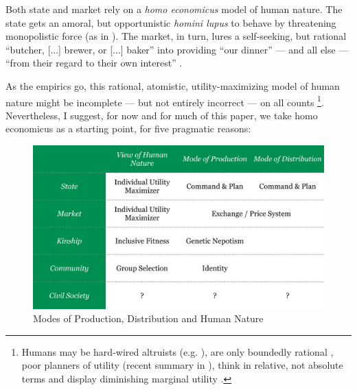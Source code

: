 \documentclass[11pt,a4paper,oneside,openright]{article}
\begin{document}
\begin{enumerate}
	Both state and market rely on a \emph{homo economicus} model of human nature. 
	The state gets an amoral, but opportunistic \emph{homini lupus} to behave by threatening monopolistic force (as in \citealt{Hobbes-1651-aa}). 
	The market, in turn, lures a self-seeking, but rational ``butcher, [...] brewer, or [...] baker'' into providing ``our dinner'' --- and all else --- ``from their regard to their own interest'' \citep{Smith-1776-lq}.

	As the empirics go, this rational, atomistic, utility-maximizing model of human nature might be incomplete --- but not entirely incorrect --- on all counts
	\footnote{
		Humans may be hard-wired altruists (e.g. \citealt{Zak2004}), are only boundedly rational \citep{Simon-1999-aa,Kahneman2011}, poor planners of utility (recent summary in \citealt{Gilbert2006}), think in relative, not absolute terms \citep{Frank2005} and display diminishing marginal utility \citep{Ng-1997-aa,Veenhoven-2000-aa,Nickell2008}.
	}. 
	Nevertheless, I suggest, for now and for much of this paper, we take homo economicus as a starting point, for five pragmatic reasons:%
	
	
\begin{figure}[htbp]
	\centering
	\includegraphics[width=1\linewidth]{./img/modes-human-nature}  
	\caption{Modes of Production, Distribution and Human Nature}
	\label{fig:modes-human-nature}
\end{figure} 


\end{enumerate}
\end{document}
